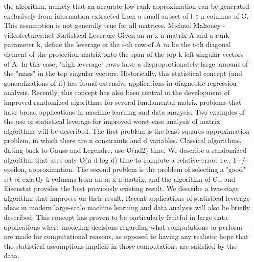 the algorithm, namely that an accurate low-rank approximation can be generated exclusively from information extracted from a small subset of l « n columns of G. This assumption is not generally true for all matrices.  Michael Mahoney - videolectures.net Statistical Leverage Given an m x n matrix A and a rank parameter k, define the leverage of the i-th row of A to be the i-th diagonal element of the projection matrix onto the span of the top k left singular vectors of A. In this case, "high leverage" rows have a disproportionately large amount of the "mass" in the top singular vectors. Historically, this statistical concept (and generalizations of it) has found extensive applications in diagnostic regression analysis. Recently, this concept has also been central in the development of improved randomized algorithms for several fundamental matrix problems that have broad applications in machine learning and data analysis. Two examples of the use of statistical leverage for improved worst-case analysis of matrix algorithms will be described. The first problem is the least squares approximation problem, in which there are n constraints and d variables. Classical algorithms, dating back to Gauss and Legendre, use O(nd2) time. We describe a randomized algorithm that uses only O(n d log d) time to compute a relative-error, i.e., 1+/-epsilon, approximation. The second problem is the problem of selecting a "good" set of exactly k columns from an m x n matrix, and the algorithm of Gu and Eisenstat provides the best previously existing result. We describe a two-stage algorithm that improves on their result. Recent applications of statistical leverage ideas in modern large-scale machine learning and data analysis will also be briefly described. This concept has proven to be particularly fruitful in large data applications where modeling decisions regarding what computations to perform are made for computational reasons, as opposed to having any realistic hope that the statistical assumptions implicit in those computations are satisfied by the data. 